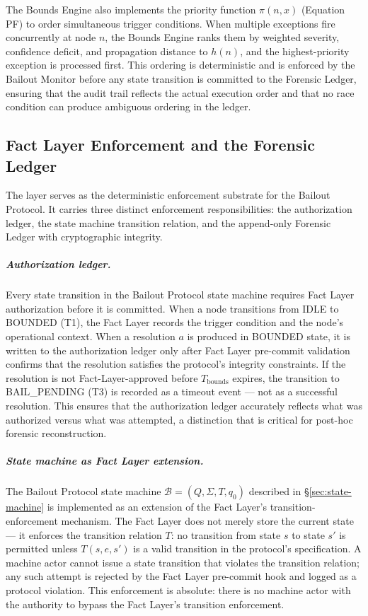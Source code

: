 The Bounds Engine also implements the priority function $\pi(n, x)$ (Equation PF) to order simultaneous trigger conditions. When multiple exceptions fire concurrently at node $n$, the Bounds Engine ranks them by weighted severity, confidence deficit, and propagation distance to $h(n)$, and the highest-priority exception is processed first. This ordering is deterministic and is enforced by the Bailout Monitor before any state transition is committed to the Forensic Ledger, ensuring that the audit trail reflects the actual execution order and that no race condition can produce ambiguous ordering in the ledger.

\subsection{Fact Layer Enforcement and the Forensic Ledger}

The \fact{} layer serves as the deterministic enforcement substrate for the Bailout Protocol. It carries three distinct enforcement responsibilities: the authorization ledger, the state machine transition relation, and the append-only Forensic Ledger with cryptographic integrity.

\subparagraph{Authorization ledger.} Every state transition in the Bailout Protocol state machine requires Fact Layer authorization before it is committed. When a node transitions from IDLE to BOUNDED (T1), the Fact Layer records the trigger condition and the node's operational context. When a resolution $a$ is produced in BOUNDED state, it is written to the authorization ledger only after Fact Layer pre-commit validation confirms that the resolution satisfies the protocol's integrity constraints. If the resolution is not Fact-Layer-approved before $T_{\text{bounds}}$ expires, the transition to BAIL\_PENDING (T3) is recorded as a timeout event — not as a successful resolution. This ensures that the authorization ledger accurately reflects what was authorized versus what was attempted, a distinction that is critical for post-hoc forensic reconstruction.

\subparagraph{State machine as Fact Layer extension.} The Bailout Protocol state machine $\mathcal{B} = (Q, \Sigma, T, q_0)$ described in \S\ref{sec:state-machine} is implemented as an extension of the Fact Layer's transition-enforcement mechanism. The Fact Layer does not merely store the current state — it enforces the transition relation $T$: no transition from state $s$ to state $s'$ is permitted unless $T(s, e, s')$ is a valid transition in the protocol's specification. A machine actor cannot issue a state transition that violates the transition relation; any such attempt is rejected by the Fact Layer pre-commit hook and logged as a protocol violation. This enforcement is absolute: there is no machine actor with the authority to bypass the Fact Layer's transition enforcement.

